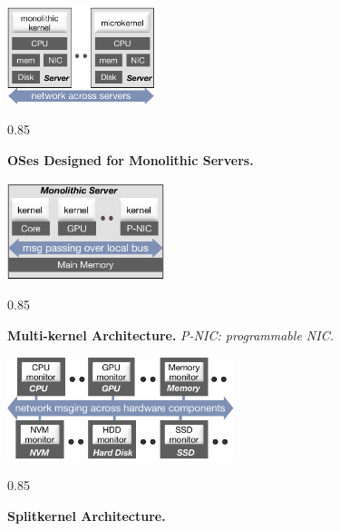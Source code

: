 \documentclass[10pt,times,twocolumn]{z2-article}
\renewcommand{\em}{\it}
\newcommand{\figSep}{\columnsep}
\newcommand{\beforecaption}{\vspace{-.15cm}\begin{spacing}{0.85}}
\newcommand{\aftercaption}{\vspace{-.45cm}\end{spacing}}
\newcommand{\mycaption}[3]{\beforecaption\caption{\label{#1}{\bf\footnotesize #2} \em\scriptsize #3}\aftercaption}
\begin{document}
{\begin{figure}[th]
\begin{minipage}{1.7in}
\begin{center}
\centerline{\includegraphics[width=1.7in]{Figures/monolithic-arch.pdf}}
\vspace{-0.1in}
\mycaption{fig-monolithic}{OSes Designed for Monolithic Servers.}
{
}
\end{center}
\end{minipage}
\begin{minipage}{0.05in}
\hspace{0.05in}
\end{minipage}
\begin{minipage}{1.9in}
\begin{center}
\centerline{\includegraphics[width=1.8in]{Figures/multikernel-arch.pdf}}
\vspace{-0.1in}
\mycaption{fig-multikernel}{Multi-kernel Architecture.}
{
\small{P-NIC: programmable NIC.}
}
\end{center}
\end{minipage}
\begin{minipage}{0.05in}
\hspace{0.05in}
\end{minipage}
\begin{minipage}{2.6in}
\begin{center}
\centerline{\includegraphics[width=2.6in]{Figures/lego-arch.pdf}}
\vspace{-0.1in}
\mycaption{fig-architecture}{Splitkernel Architecture.}
{
}
\end{center}
\end{minipage}
\begin{minipage}{0.01in}
\end{minipage}
\vspace{-0.15in}
\end{figure}
}
\end{document}
